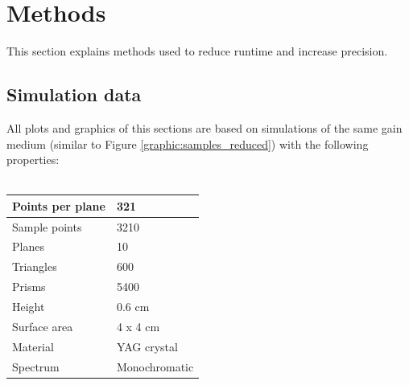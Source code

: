 \section{Methods}

This section explains methods used to reduce runtime and
increase precision.

\subsection{Simulation data}
All plots and graphics of this sections
are based on simulations of the same gain medium (similar to Figure \ref{graphic:samples_reduced})
with the following properties:
\\
\\
\begin{tabular}{| l | l |}
\hline
Points per plane        & 321\\
\hline
Sample points           & 3210\\
\hline
Planes                  & 10\\
\hline
Triangles               & 600\\
\hline
Prisms                  & 5400\\
\hline
Height                  & 0.6 cm\\
\hline
Surface area            & 4 x 4 cm\\
\hline
Material                & YAG crystal\\
\hline
Spectrum                & Monochromatic\\
\hline
\end{tabular}


